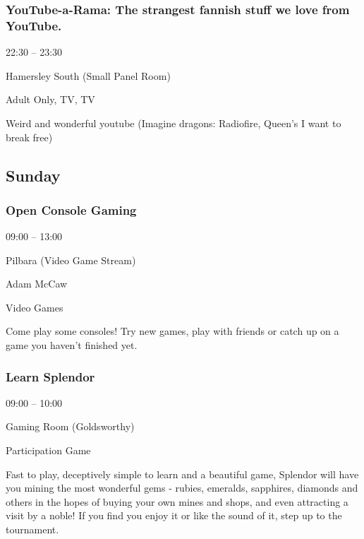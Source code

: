 \documentclass{scrreprt}
\begin{document}
\begin{multicols}{2}
\subsubsection*{YouTube-a-Rama: The strangest fannish stuff we love from YouTube.}\begin{description}
\setlength{\itemsep}{0pt}
\setlength{\parsep}{0pt}
\setlength{\parskip}{0pt}
\item[Time:]{22:30 -- 23:30}
\item[Venue:]{Hamersley South (Small Panel Room)}
\item[Tags:]{Adult Only, TV, TV}\end{description}
Weird and wonderful youtube (Imagine dragons: Radiofire, Queen's I want to break free)
\subsection*{Sunday}\subsubsection*{Open Console Gaming}\begin{description}
\setlength{\itemsep}{0pt}
\setlength{\parsep}{0pt}
\setlength{\parskip}{0pt}
\item[Time:]{09:00 -- 13:00}
\item[Venue:]{Pilbara (Video Game Stream)}
\item[People:]{Adam McCaw}
\item[Tags:]{Video Games}\end{description}
Come play some consoles! Try new games, play with friends or catch up on a game you haven't finished yet.
\subsubsection*{Learn Splendor}\begin{description}
\setlength{\itemsep}{0pt}
\setlength{\parsep}{0pt}
\setlength{\parskip}{0pt}
\item[Time:]{09:00 -- 10:00}
\item[Venue:]{Gaming Room (Goldsworthy)}
\item[Tags:]{Participation Game}\end{description}
Fast to play, deceptively simple to learn and a beautiful game, Splendor will have you mining the most wonderful gems - rubies, emeralds, sapphires, diamonds and others in the hopes of buying your own mines and shops, and even attracting a visit by a noble! If you find you enjoy it or like the sound of it, step up to the tournament.

\end{multicols}
\end{document}
